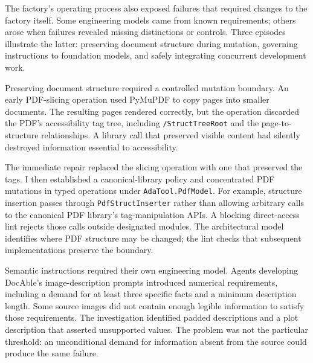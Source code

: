 
The factory's operating process also exposed failures that required changes to the factory itself. Some engineering models came from known requirements; others arose when failures revealed missing distinctions or controls. Three episodes illustrate the latter: preserving document structure during mutation, governing instructions to foundation models, and safely integrating concurrent development work.

Preserving document structure required a controlled mutation boundary. An early PDF-slicing operation used PyMuPDF to copy pages into smaller documents. The resulting pages rendered correctly, but the operation discarded the PDF's accessibility tag tree, including \texttt{/StructTreeRoot} and the page-to-structure relationships. A library call that preserved visible content had silently destroyed information essential to accessibility.

The immediate repair replaced the slicing operation with one that preserved the tags. I then established a canonical-library policy and concentrated PDF mutations in typed operations under \texttt{AdaTool.PdfModel}. For example, structure insertion passes through \texttt{PdfStructInserter} rather than allowing arbitrary calls to the canonical PDF library's tag-manipulation APIs. A blocking direct-access lint rejects those calls outside designated modules. The architectural model identifies where PDF structure may be changed; the lint checks that subsequent implementations preserve the boundary.

Semantic instructions required their own engineering model. Agents developing DocAble's image-description prompts introduced numerical requirements, including a demand for at least three specific facts and a minimum description length. Some source images did not contain enough legible information to satisfy those requirements. The investigation identified padded descriptions and a plot description that asserted unsupported values. The problem was not the particular threshold: an unconditional demand for information absent from the source could produce the same failure.

